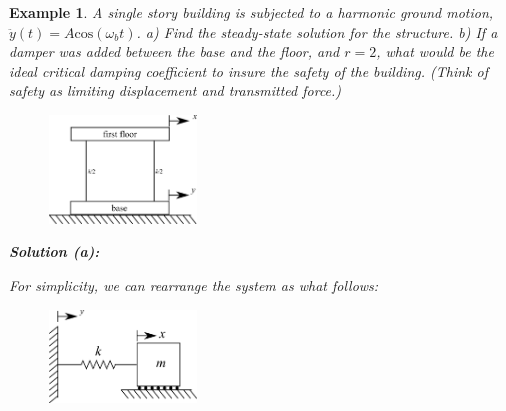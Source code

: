 \documentclass[12pt,letter]{article}
\newtheorem{ex}{Example}
\numberwithin{ex}{section} %
\newenvironment{example}{\begin{mdframed}[middlelinewidth=0.5mm]\begin{ex}\normalfont}{\end{ex}\end{mdframed}}
\numberwithin{re}{section} %
\begin{document}
\begin{example}
	
			A single story building is subjected to a harmonic ground motion, $\ddot{y}(t) = A \text{cos}(\omega_b t)$. a) Find the steady-state solution for the structure.  b) If a damper was added between the base and the floor, and $r=2$, what would be the ideal critical damping coefficient to insure the safety of the building. (Think of safety as limiting displacement and transmitted force.) 
			\begin{figure}[H]
				\centering
				\includegraphics[width=0.35\textwidth]{../Figures/base_excited_structure.png}
			\end{figure}				
						
			\noindent\textbf{Solution (a):}
				
			For simplicity, we can rearrange the system as what follows:
			\begin{figure}[H]
				\centering
				\includegraphics[width=0.35\textwidth]{../Figures/base_excited_structure_simple.png}
			\end{figure}			


\end{example}
\end{document}
